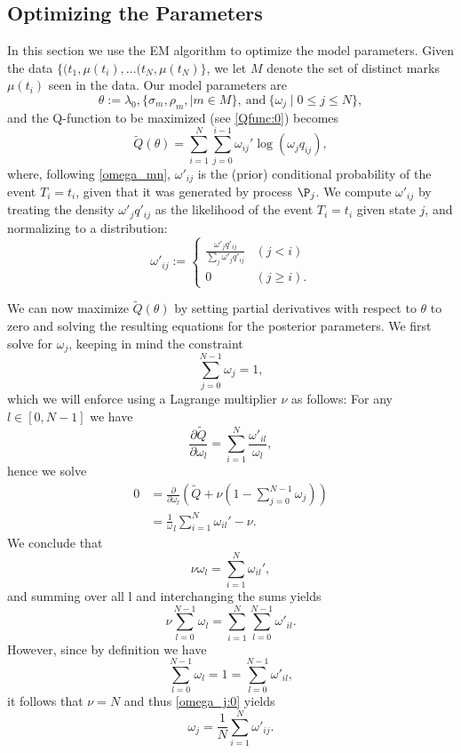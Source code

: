 \documentclass[12pt,leqno]{article}
\begin{document}
\subsection{Optimizing the Parameters}
In this section we use the EM algorithm to optimize the model parameters.
Given the data $\{(t_1,\mu(t_i),\dots(t_N,\mu(t_N)\}$, we let $M$ denote the set of distinct marks $\mu(t_i)$
seen in the data.  Our model parameters are
$$
\theta := \lambda_0, \{\sigma_m, \rho_m, \mid m \in M\},~\text{and}~ \{\omega_j\mid 0\le j\le N\},
$$
and the Q-function to be maximized (see \eqref{Qfunc:0}) becomes
\begin{equation}\label{Q}
\tilde{Q}(\theta) = \sum_{i=1}^N\sum_{j=0}^{i-1}\omega_{ij}'\log(\omega_jq_{ij}),
\end{equation}
where, following \eqref{omega_mn}, $\omega'_{ij}$ is the (prior) conditional
probability of the event $T_i=t_i$,
given that it was generated by process $\P_j$.  We compute $\omega'_{ij}$ by
treating the density $\omega'_jq'_{ij}$ as the likelihood of the event $T_i = t_i$ given state $j$,
and normalizing to a distribution:
\begin{equation}\label{omega'_ij}
\omega'_{ij} :=
\begin{cases}
  \frac{\omega'_jq'_{ij}}{\sum_j\omega'_jq'_{ij}}&(j < i) \\
  0&(j \ge i).
\end{cases}
\end{equation}


We can now maximize $\tilde{Q}(\theta)$ by setting partial derivatives with respect to $\theta$ to
zero and solving the resulting equations for the posterior parameters.  We first solve for $\omega_j$, keeping in
mind the constraint
$$
\sum_{j=0}^{N-1}\omega_j = 1,
$$
which we will enforce using a Lagrange multiplier $\nu$ as follows:
For any $l \in [0,N-1]$ we have
$$
\frac{\partial\tilde{Q}}{\partial\omega_l} = \sum_{i=1}^N\frac{\omega'_{il}}{\omega_l},
$$
hence we solve
\begin{align*}
  0 &= \frac{\partial}{\partial\omega_l}\left(\tilde{Q} + \nu(1-\sum_{j=0}^{N-1}\omega_j )\right) \\
  &= \frac{1}\omega_l\sum_{i=1}^N\omega_{il}' - \nu.
\end{align*}
We conclude that
\begin{equation}\label{omega_j:0}
  \nu\omega_l = \sum_{i=1}^N\omega_{il}',
\end{equation}
and summing over all l and interchanging the sums yields
$$
  \nu\sum_{l=0}^{N-1}\omega_l = \sum_{i=1}^{N}\sum_{l=0}^{N-1}\omega'_{il}.
$$
However, since by definition we have
$$
\sum_{l=0}^{N-1} \omega_l = 1 = \sum_{l=0}^{N-1}\omega'_{il}, 
$$
it follows that $\nu = N$ and thus \eqref{omega_j:0} yields
\begin{equation}\label{omega_j}
  \omega_j = \frac{1}{N}\sum_{i=1}^N\omega'_{ij}.
\end{equation}
\end{document}
